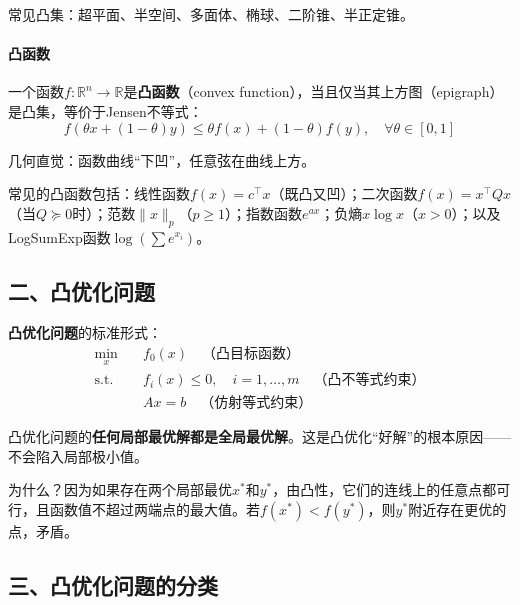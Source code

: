常见凸集：超平面、半空间、多面体、椭球、二阶锥、半正定锥。

\paragraph{凸函数}
一个函数$f: \mathbb{R}^n \to \mathbb{R}$是\textbf{凸函数}（convex function），当且仅当其上方图（epigraph）是凸集，等价于Jensen不等式：
\[
f(\theta x + (1-\theta) y) \leq \theta f(x) + (1-\theta) f(y), \quad \forall \theta \in [0, 1]
\]

几何直觉：函数曲线“下凹”，任意弦在曲线上方。


常见的凸函数包括：线性函数$f(x) = c^\top x$（既凸又凹）；二次函数$f(x) = x^\top Q x$（当$Q \succeq 0$时）；范数$\|x\|_p$（$p \geq 1$）；指数函数$e^{ax}$；负熵$x \log x$（$x > 0$）；以及LogSumExp函数$\log(\sum e^{x_i})$。

\subsection*{二、凸优化问题}

\textbf{凸优化问题}的标准形式：
\begin{align}
    \min_{x} \quad & f_0(x) \quad \text{（凸目标函数）} \\
    \text{s.t.} \quad & f_i(x) \leq 0, \quad i = 1, \ldots, m \quad \text{（凸不等式约束）} \\
    & Ax = b \quad \text{（仿射等式约束）}
\end{align}

\begin{keyidea}[凸优化的根本性质]
凸优化问题的\textbf{任何局部最优解都是全局最优解}。这是凸优化“好解”的根本原因——不会陷入局部极小值。
\end{keyidea}

为什么？因为如果存在两个局部最优$x^*$和$y^*$，由凸性，它们的连线上的任意点都可行，且函数值不超过两端点的最大值。若$f(x^*) < f(y^*)$，则$y^*$附近存在更优的点，矛盾。

\subsection*{三、凸优化问题的分类}

